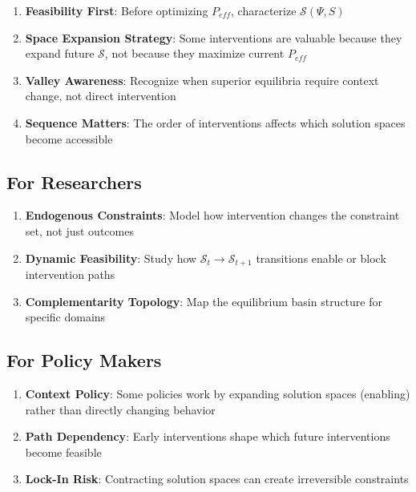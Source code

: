 \begin{enumerate}
    \item \textbf{Feasibility First}: Before optimizing $P_{eff}$, characterize $\mathcal{S}(\Psi, S)$
    \item \textbf{Space Expansion Strategy}: Some interventions are valuable because they expand future $\mathcal{S}$, not because they maximize current $P_{eff}$
    \item \textbf{Valley Awareness}: Recognize when superior equilibria require context change, not direct intervention
    \item \textbf{Sequence Matters}: The order of interventions affects which solution spaces become accessible
\end{enumerate}

\subsection{For Researchers}

\begin{enumerate}
    \item \textbf{Endogenous Constraints}: Model how intervention changes the constraint set, not just outcomes
    \item \textbf{Dynamic Feasibility}: Study how $\mathcal{S}_t \to \mathcal{S}_{t+1}$ transitions enable or block intervention paths
    \item \textbf{Complementarity Topology}: Map the equilibrium basin structure for specific domains
\end{enumerate}

\subsection{For Policy Makers}

\begin{enumerate}
    \item \textbf{Context Policy}: Some policies work by expanding solution spaces (enabling) rather than directly changing behavior
    \item \textbf{Path Dependency}: Early interventions shape which future interventions become feasible
    \item \textbf{Lock-In Risk}: Contracting solution spaces can create irreversible constraints
\end{enumerate}

